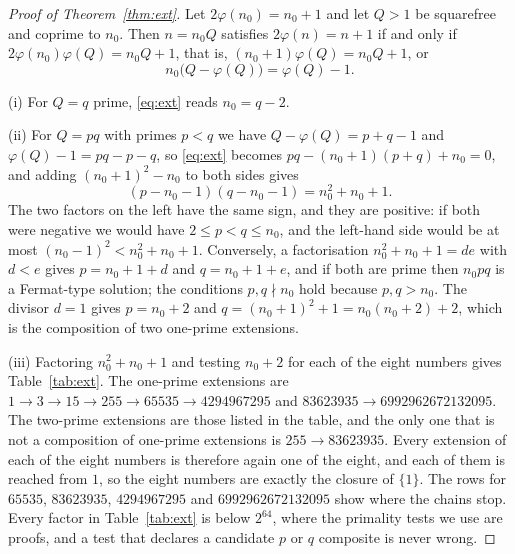 \documentclass[11pt,reqno]{amsart}
\numberwithin{equation}{section}
\theoremstyle{plain}
\theoremstyle{definition}
\theoremstyle{remark}
\begin{document}
\begin{proof}[Proof of Theorem~\ref{thm:ext}]
Let $2\varphi(n_0)=n_0+1$ and let $Q>1$ be squarefree and coprime to
$n_0$. Then $n=n_0Q$ satisfies $2\varphi(n)=n+1$ if and only if
$2\varphi(n_0)\varphi(Q)=n_0Q+1$, that is,
$(n_0+1)\varphi(Q)=n_0Q+1$, or
\begin{equation}\label{eq:ext}
  n_0\bigl(Q-\varphi(Q)\bigr)=\varphi(Q)-1 .
\end{equation}

(i) For $Q=q$ prime, \eqref{eq:ext} reads $n_0=q-2$.

(ii) For $Q=pq$ with primes $p<q$ we have $Q-\varphi(Q)=p+q-1$ and
$\varphi(Q)-1=pq-p-q$, so \eqref{eq:ext} becomes
$pq-(n_0+1)(p+q)+n_0=0$, and adding $(n_0+1)^2-n_0$ to both sides gives
\[
  (p-n_0-1)(q-n_0-1)=n_0^2+n_0+1 .
\]
The two factors on the left have the same sign, and they are
positive: if both were negative we would have $2\le p<q\le n_0$, and the left-hand side would be at most
$(n_0-1)^2<n_0^2+n_0+1$. Conversely, a factorisation
$n_0^2+n_0+1=de$ with $d<e$ gives $p=n_0+1+d$ and $q=n_0+1+e$, and if
both are prime then $n_0pq$ is a Fermat-type solution; the conditions
$p,q\nmid n_0$ hold because $p,q>n_0$. The divisor $d=1$ gives
$p=n_0+2$ and $q=(n_0+1)^2+1=n_0(n_0+2)+2$, which is the composition
of two one-prime extensions.

(iii) Factoring $n_0^2+n_0+1$ and testing $n_0+2$ for each of the
eight numbers gives Table~\ref{tab:ext}. The one-prime extensions are
$1\to3\to15\to255\to65535\to4294967295$ and
$83623935\to6992962672132095$. The two-prime extensions are those
listed in the table, and the only one that is not a composition of
one-prime extensions is $255\to83623935$. Every extension of each of
the eight numbers is therefore again one of the eight, and each of them
is reached from $1$, so the eight numbers are exactly the closure of
$\{1\}$. The rows for $65535$, $83623935$, $4294967295$ and
$6992962672132095$ show where the chains stop. Every factor in
Table~\ref{tab:ext} is below $2^{64}$, where the primality tests we use
are proofs, and a test that declares a candidate $p$ or $q$ composite
is never wrong.
\end{proof}
\end{document}
